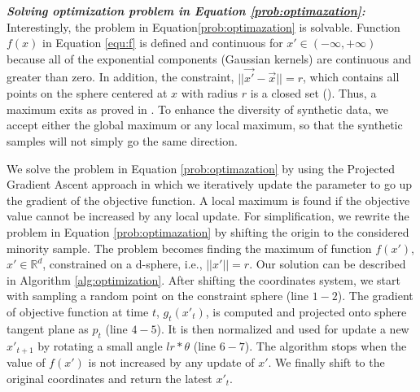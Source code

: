 \textbf{\textit{Solving optimization problem in Equation \ref{prob:optimazation}:}} Interestingly, the problem in Equation\ref{prob:optimazation} is solvable. Function $f(x)$ in Equation \ref{equ:f} is defined and continuous for $x' \in (-\infty, +\infty)$ because all of the exponential components (Gaussian kernels) are continuous and greater than zero. In addition, the constraint, $||\vec{x'} - \vec{x}||=r$, which contains all points on the sphere centered at $x$ with radius $r$ is a closed set (\cite{wikipedia_2021}). Thus, a maximum exits as proved in \cite{maximum_exist}. To enhance the diversity of synthetic data, we accept either the global maximum or any local maximum, so that the synthetic samples will not simply go the same direction.  


We solve the problem in Equation \ref{prob:optimazation} by using the Projected Gradient Ascent approach in which we iteratively update the parameter to go up the gradient of the objective function. A local maximum is found if the objective value cannot be increased by any local update. For simplification, we rewrite the problem in Equation \ref{prob:optimazation} by shifting the origin to the considered minority sample. The problem becomes finding the maximum of function $f(x')$, $x' \in \mathbb{R}^d$, constrained on a d-sphere, i.e., $||x'||=r$. Our solution can be described in Algorithm \ref{alg:optimization}. After shifting the coordinates system, we start with sampling a random point on the constraint sphere (line $1-2$). The gradient of objective function at time $t$, $g_t(x'_t)$, is computed and projected onto sphere tangent plane as $p_t$ (line $4-5$). It is then normalized and used for update a new $x'_{t+1}$ by rotating a small angle $lr*\theta$ (line $6-7$). The algorithm stops when the value of $f(x')$ is not increased by any update of $x'$. We finally shift to the original coordinates and return the latest $x'_t$.   

